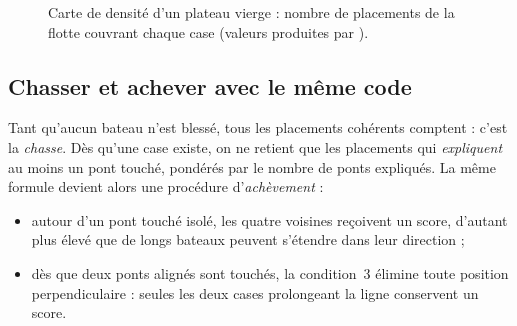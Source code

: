 \begin{figure}[ht]
    \centering
    \caption{Carte de densité d'un plateau vierge : nombre de placements de la flotte
        couvrant chaque case (valeurs produites par ).}
    \label{fig-densite}
\end{figure}

\subsection{Chasser et achever avec le même code}

Tant qu'aucun bateau n'est blessé, tous les placements cohérents comptent : c'est la
\emph{chasse}. Dès qu'une case  existe, on ne retient que les placements qui
\emph{expliquent} au moins un pont touché, pondérés par le nombre de ponts expliqués. La
même formule devient alors une procédure d'\emph{achèvement} :

\begin{itemize}
    \item autour d'un pont touché isolé, les quatre voisines reçoivent un score, d'autant
          plus élevé que de longs bateaux peuvent s'étendre dans leur direction ;
    \item dès que deux ponts alignés sont touchés, la condition~3 élimine toute position
          perpendiculaire : seules les deux cases prolongeant la ligne conservent un score.
\end{itemize}


